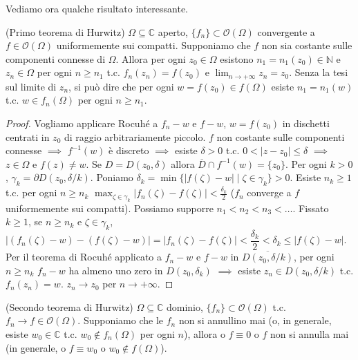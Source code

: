 Vediamo ora qualche risultato interessante.

\begin{thm}
  (Primo teorema di Hurwitz) $\Omega \subseteq \mathbb{C}$ aperto, $\{f_n\} \subset \mathcal{O}(\Omega)$ convergente a $f\in \mathcal{O}(\Omega)$ uniformemente sui compatti. Supponiamo che $f$ non sia costante sulle componenti connesse di $\Omega$.
  Allora per ogni $z_0 \in \Omega$ esistono $n_1=n_1(z_0) \in \mathbb{N}$ e $z_n \in \Omega$ per ogni $n \ge n_1$ t.c. $f_n(z_n)=f(z_0)$ e $\displaystyle \lim_{n \longrightarrow +\infty} z_n=z_0$.
  Senza la tesi sul limite di $z_n$, si può dire che per ogni $w=f(z_0) \in f(\Omega)$ esiste $n_1=n_1(w)$ t.c. $w \in f_n(\Omega)$ per ogni $n \ge n_1$.
\end{thm}

\begin{proof}
  Vogliamo applicare Rocuhé a $f_n-w$ e $f-w$, $w=f(z_0)$ in dischetti centrati in $z_0$ di raggio arbitrariamente piccolo. $f$ non costante sulle componenti connesse $\implies$ $f^{-1}(w)$ è discreto $\implies$ esiste $\delta>0$ t.c. $0<|z-z_0| \le \delta$ $\implies$ $z \in \Omega$ e $f(z) \not=w$.
  Se $D=D(z_0, \delta)$ allora $\overline{D} \cap f^{-1}(w)=\{z_0\}$. Per ogni $k>0$, $\gamma_k=\partial D(z_0, \delta/k)$. Poniamo $\delta_k=\min\{|f(\zeta)-w| \mid \zeta \in \gamma_k\}>0$.
  Esiste $n_k \ge 1$ t.c. per ogni $n \ge n_k$ $\displaystyle \max_{\zeta \in \gamma_k} |f_n(\zeta)-f(\zeta)|<\frac{\delta_k}{2}$ ($f_n$ converge a $f$ uniformemente sui compatti). Possiamo supporre $n_1<n_2<n_3<\dots$.
  Fissato $k \ge 1$, se $n \ge n_k$ e $\zeta \in \gamma_k$, $|(f_n(\zeta)-w)-(f(\zeta)-w)|=|f_n(\zeta)-f(\zeta)|<\dfrac{\delta_k}{2}<\delta_k \le |f(\zeta)-w|$.
  Per il teorema di Rocuhé applicato a $f_n-w$ e $f-w$ in $\overline{D(z_0, \delta/k)}$, per ogni $n \ge n_k$ $f_n-w$ ha almeno uno zero in $D(z_0, \delta_k)$ $\implies$ esiste $z_n \in D(z_0, \delta/k)$ t.c. $f_n(z_n)=w$. $z_n \longrightarrow z_0$ per $n \longrightarrow +\infty$.
\end{proof}

\begin{cor}
  (Secondo teorema di Hurwitz) $\Omega \subseteq \mathbb{C}$ dominio, $\{f_n\} \subset \mathcal{O}(\Omega)$ t.c. $f_n \longrightarrow f \in \mathcal{O}(\Omega)$. Supponiamo che le $f_n$ non si annullino mai (o, in generale, esiste $w_0 \in \mathbb{C}$ t.c. $w_0 \not\in f_n(\Omega)$ per ogni $n$),
  allora o $f \equiv 0$ o $f$ non si annulla mai (in generale, o $f \equiv w_0$ o $w_0 \not\in f(\Omega)$).
\end{cor}

